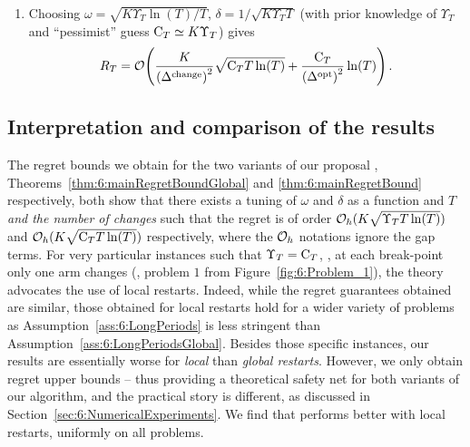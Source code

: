 \begin{corollary}
\begin{enumerate}
        \item
        Choosing $\omega = \sqrt{K\Upsilon_T\ln(T) / T}$, $\delta = 1 / \sqrt{K\Upsilon_T T}$ (with prior knowledge of $\Upsilon_T$ and ``pessimist'' guess $\mathrm{C}_T \simeq K \Upsilon_T$) gives
        \begin{equation}
            R_T = \mathop{}\mathopen{}\mathcal{O}\mathopen{}\left(\frac{K}{\left({\Delta}^{\text{change}}\right)^2}\sqrt{\mathrm{C}_T T\ln(T)} + \frac{\mathrm{C}_T}{\left(\Delta^{\text{opt}}\right)^2} \ln(T)\right).
        \end{equation}
    \end{enumerate}
\end{corollary}


\subsection{Interpretation and comparison of the results}
\label{sub:6:interpretationRegretBounds}

The regret bounds we obtain for the two variants of our proposal \GLRklUCB{},
Theorems~\ref{thm:6:mainRegretBoundGlobal} and \ref{thm:6:mainRegretBound} respectively,
both show that there exists a tuning of $\omega$ and $\delta$ as a function and $T$ \emph{and the number of changes} such that the regret is of order $\mathcal{O}_h(K\sqrt{\Upsilon_T T \ln(T)})$ and $\mathcal{O}_h(K\sqrt{\mathrm{C}_T T \ln(T)})$ respectively, where the $\mathcal{O}_h$ notations ignore the gap terms.
%
For very particular instances such that $\Upsilon_T = \mathrm{C}_T$, \ie, at each break-point only one arm changes (\eg, problem $1$ from Figure~\ref{fig:6:Problem_1}), the theory advocates the use of local restarts.
%
Indeed, while the regret guarantees obtained are similar, those obtained for local restarts hold for a wider variety of problems as Assumption~\ref{ass:6:LongPeriods} is less stringent than Assumption~\ref{ass:6:LongPeriodsGlobal}.
%
Besides those specific instances, our results are essentially worse for \emph{local} than \emph{global restarts}. However, we only obtain regret upper bounds -- thus providing a theoretical safety net for both variants of our algorithm, and the practical story is different, as discussed in Section~\ref{sec:6:NumericalExperiments}.
We find that \GLRklUCB{} performs better with local restarts, uniformly on all problems.

